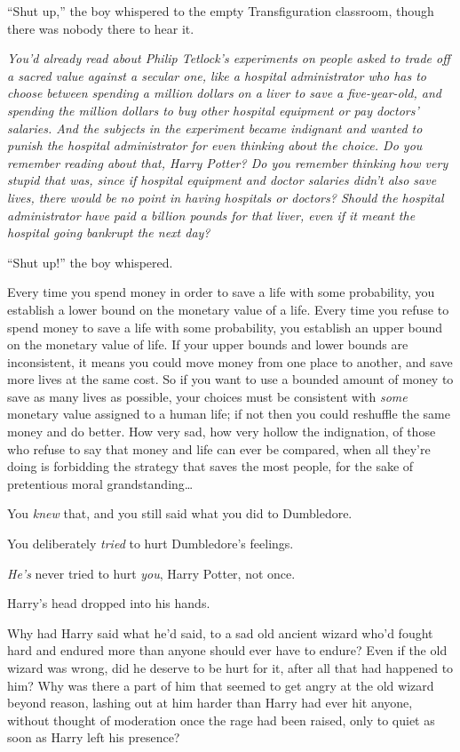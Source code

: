 “Shut up,” the boy whispered to the empty Transfiguration classroom, though there was nobody there to hear it.

\emph{You’d already read about Philip Tetlock’s experiments on people asked to trade off a sacred value against a secular one, like a hospital administrator who has to choose between spending a million dollars on a liver to save a five-year-old, and spending the million dollars to buy other hospital equipment or pay doctors’ salaries. And the subjects in the experiment became indignant and wanted to punish the hospital administrator for even thinking about the choice. Do you remember reading about that, Harry Potter? Do you remember thinking how very stupid that was, since if hospital equipment and doctor salaries didn’t also save lives, there would be no point in having hospitals or doctors? Should the hospital administrator have paid a billion pounds for that liver, even if it meant the hospital going bankrupt the next day?}

“Shut up!” the boy whispered.

\begin{em}
Every time you spend money in order to save a life with some probability, you establish a lower bound on the monetary value of a life. Every time you refuse to spend money to save a life with some probability, you establish an upper bound on the monetary value of life. If your upper bounds and lower bounds are inconsistent, it means you could move money from one place to another, and save more lives at the same cost. So if you want to use a bounded amount of money to save as many lives as possible, your choices must be consistent with \emph{some} monetary value assigned to a human life; if not then you could reshuffle the same money and do better. How very sad, how very hollow the indignation, of those who refuse to say that money and life can ever be compared, when all they’re doing is forbidding the strategy that saves the most people, for the sake of pretentious moral grandstanding…

You \emph{knew} that, and you still said what you did to Dumbledore.

You deliberately \emph{tried} to hurt Dumbledore’s feelings.

\emph{He’s} never tried to hurt \emph{you}, Harry Potter, not once.
\end{em}

Harry’s head dropped into his hands.

Why had Harry said what he’d said, to a sad old ancient wizard who’d fought hard and endured more than anyone should ever have to endure? Even if the old wizard was wrong, did he deserve to be hurt for it, after all that had happened to him? Why was there a part of him that seemed to get angry at the old wizard beyond reason, lashing out at him harder than Harry had ever hit anyone, without thought of moderation once the rage had been raised, only to quiet as soon as Harry left his presence?

